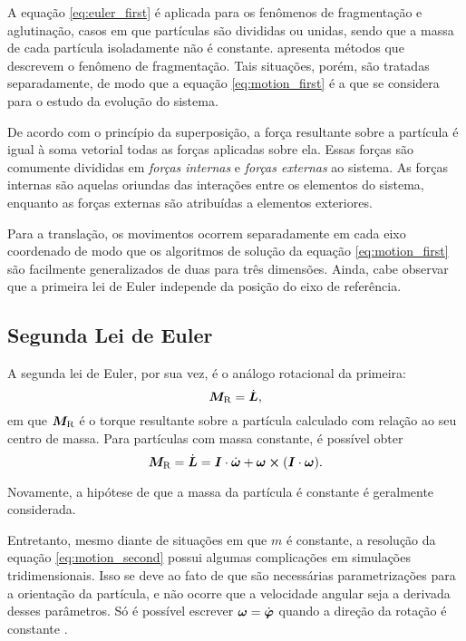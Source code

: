 A equação \eqref{eq:euler_first} é aplicada para os fenômenos de fragmentação e aglutinação, casos em que partículas são divididas ou unidas, sendo que a massa de cada partícula isoladamente não é constante.  apresenta métodos que descrevem o fenômeno de fragmentação. Tais situações, porém, são tratadas separadamente, de modo que a equação \eqref{eq:motion_first} é a que se considera para o estudo da evolução do sistema.

De acordo com o princípio da superposição, a força resultante sobre a partícula é igual à soma vetorial todas as forças aplicadas sobre ela. Essas forças são comumente divididas em \textit{forças internas} e \textit{forças externas} ao sistema. As forças internas são aquelas oriundas das interações entre os elementos do sistema, enquanto as forças externas são atribuídas a elementos exteriores.

Para a translação, os movimentos ocorrem separadamente em cada eixo coordenado de modo que os algoritmos de solução da equação \eqref{eq:motion_first} são facilmente generalizados de duas para três dimensões. Ainda, cabe observar que a primeira lei de Euler independe da posição do eixo de referência.

\subsection{Segunda Lei de Euler}

A segunda lei de Euler, por sua vez, é o análogo rotacional da primeira:
\begin{equation*} %
	\resultingTorque = \deriv{1}{\angularMomentum},
\end{equation*}
em que \(\bm{M}_{\text{R}}\) é o torque resultante sobre a partícula calculado com relação ao seu centro de massa. Para partículas com massa constante, é possível obter
\begin{equation} \label{eq:motion_second}
	\resultingTorque = \deriv{1}{\angularMomentum} = \tensorOfInertia\cdot\deriv{1}{\angularVelocity} + \angularVelocity\cross\pqty{\tensorOfInertia\cdot\angularVelocity}.
\end{equation}

Novamente, a hipótese de que a massa da partícula é constante é geralmente considerada. 

Entretanto, mesmo diante de situações em que \(m\) é constante, a resolução da equação \eqref{eq:motion_second} possui algumas complicações em simulações tridimensionais. Isso se deve ao fato de que são necessárias parametrizações para a orientação da partícula, e não ocorre que a velocidade angular seja a derivada desses parâmetros. Só é possível escrever \(\angularVelocity = \deriv{1}{\orientation}\) quando a direção da rotação é constante \cite[p. 32]{bib:dynamics_of_multibody_systems}.

